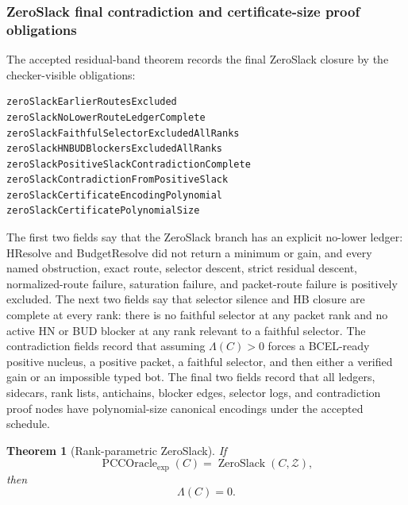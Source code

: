 \documentclass[10.5pt,a4paper]{article}
\newtheorem{theorem}{Theorem}[section]
\newcommand{\PCCOracle}{\operatorname{PCCOracle}_{\exp}}
\newcommand{\ZeroSlack}{\operatorname{ZeroSlack}}
\begin{document}
\subsubsection{ZeroSlack final contradiction and certificate-size proof obligations}
The accepted residual-band theorem records the final ZeroSlack closure by the checker-visible obligations:
\begin{lstlisting}
zeroSlackEarlierRoutesExcluded
zeroSlackNoLowerRouteLedgerComplete
zeroSlackFaithfulSelectorExcludedAllRanks
zeroSlackHNBUDBlockersExcludedAllRanks
zeroSlackPositiveSlackContradictionComplete
zeroSlackContradictionFromPositiveSlack
zeroSlackCertificateEncodingPolynomial
zeroSlackCertificatePolynomialSize
\end{lstlisting}
The first two fields say that the ZeroSlack branch has an explicit no-lower ledger: HResolve and BudgetResolve did not return a minimum or gain, and every named obstruction, exact route, selector descent, strict residual descent, normalized-route failure, saturation failure, and packet-route failure is positively excluded.  The next two fields say that selector silence and HB closure are complete at every rank: there is no faithful selector at any packet rank and no active HN or BUD blocker at any rank relevant to a faithful selector.  The contradiction fields record that assuming \(\Lambda(C)>0\) forces a BCEL-ready positive nucleus, a positive packet, a faithful selector, and then either a verified gain or an impossible typed bot.  The final two fields record that all ledgers, sidecars, rank lists, antichains, blocker edges, selector logs, and contradiction proof nodes have polynomial-size canonical encodings under the accepted schedule.

\begin{theorem}[Rank-parametric ZeroSlack]
If
\[
\PCCOracle(C)=\ZeroSlack(C,\mathcal Z),
\]
then
\[
\Lambda(C)=0.
\]
\end{theorem}
\end{document}
